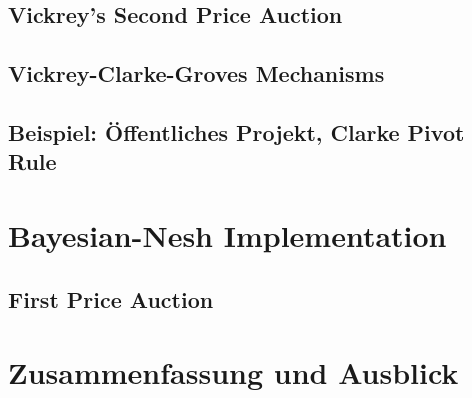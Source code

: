 \documentclass[a4paper,11pt]{article}
\theoremstyle{definition}
\theoremstyle{plain}
\theoremstyle{definition}
\begin{document}
\subsection{Vickrey's Second Price Auction}
\subsection{Vickrey-Clarke-Groves Mechanisms}
\subsection{Beispiel: Öffentliches Projekt, Clarke Pivot Rule}

\section{Bayesian-Nesh Implementation}
\subsection{First Price Auction}

\section{Zusammenfassung und Ausblick}
~\cite{lov21}



\end{document}

